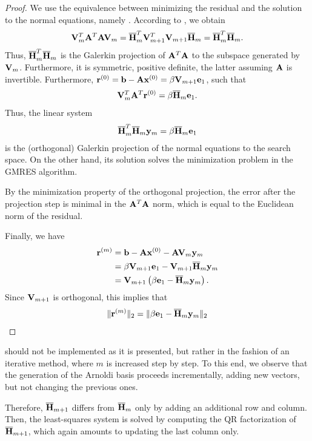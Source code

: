 \begin{proof}
  We use the equivalence between minimizing the residual and the
  solution to the normal equations, namely
  . According to
  , we obtain
  \begin{gather}
    \mathbf V_m^T\mathbf A^T\mathbf A\mathbf V_m
    = \overline{\mathbf H}_m^T \mathbf V_{m+1}^T\mathbf V_{m+1}\overline{\mathbf H}_m
    = \overline{\mathbf H}_m^T\overline{\mathbf H}_m.
  \end{gather}
  Thus, $\overline{\mathbf H}_m^T\overline{\mathbf H}_m$ is the Galerkin
  projection of $\mathbf A^T\mathbf A$ to the subspace generated by
  $\mathbf V_m$. Furthermore, it is symmetric, positive definite, the
  latter assuming $\mathbf A$ is invertible.  Furthermore,
  $\mathbf r^{(0)} = \mathbf b-\mathbf A\mathbf x^{(0)} = \beta\mathbf V_{m+1}\mathbf e_1$, such that
  \begin{gather}
    \mathbf V_m^T\mathbf A^T\mathbf r^{(0)} = \beta\overline{\mathbf H}_m \mathbf e_1.
  \end{gather}
  Thus, the linear system
  \begin{gather}
    \overline{\mathbf H}_m^T\overline{\mathbf H}_m \mathbf y_m = \beta\overline{\mathbf H}_m \mathbf e_1
  \end{gather}
  is the (orthogonal) Galerkin projection of the normal equations to
  the search space. On the other hand, its solution solves the
  minimization problem in the GMRES algorithm.

  By the minimization property of the orthogonal projection, the error
  after the projection step is minimal in the $\mathbf A^T\mathbf A$ norm,
  which is equal to the Euclidean norm of the residual.

  Finally, we have
  \begin{align}
    \mathbf r^{(m)}
    &= \mathbf b-\mathbf A\mathbf x^{(0)} - \mathbf A\mathbf V_m\mathbf y_m\\
    &=\beta\mathbf V_{m+1}\mathbf e_1 - \mathbf V_{m+1}\overline{\mathbf H}_m\mathbf y_m\\
    &= \mathbf V_{m+1}\left(\beta\mathbf e_1 - \overline{\mathbf H}_m\mathbf y_m\right).
  \end{align}
  Since $\mathbf V_{m+1}$ is orthogonal, this implies that
  \begin{gather}
    \lVert\mathbf r^{(m)}\rVert_2 = \lVert\beta\mathbf e_1 - \overline{\mathbf H}_m\mathbf y_m\rVert_2
  \end{gather}
\end{proof}

\begin{remark}
   should not be implemented as it is
  presented, but rather in the fashion of an iterative method, where
  $m$ is increased step by step. To this end, we observe that the
  generation of the Arnoldi basis proceeds incrementally, adding new
  vectors, but not changing the previous ones.

  Therefore, $\overline{\mathbf H}_{m+1}$ differs from $\overline{\mathbf H}_{m}$
  only by adding an additional row and column. Then, the least-squares
  system is solved by computing the QR factorization of
  $\overline{\mathbf H}_{m+1}$, which again amounts to updating the last
  column only.
\end{remark}

